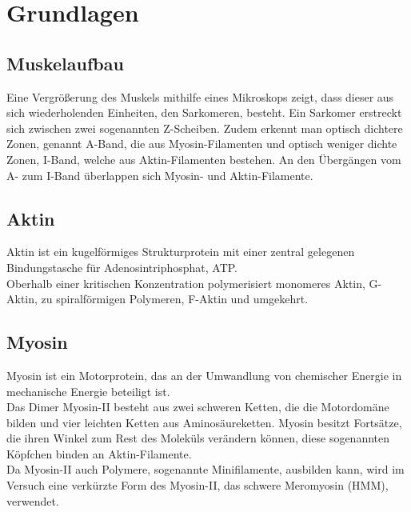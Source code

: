 
\section{Grundlagen}
\subsection{Muskelaufbau}
Eine Vergrößerung des Muskels mithilfe eines Mikroskops zeigt, dass dieser aus sich wiederholenden Einheiten, den Sarkomeren, besteht. Ein Sarkomer erstreckt sich zwischen zwei sogenannten Z-Scheiben. Zudem erkennt man optisch dichtere Zonen, genannt A-Band, die aus Myosin-Filamenten und optisch weniger dichte Zonen, I-Band, welche aus Aktin-Filamenten bestehen. An den Übergängen vom A- zum I-Band überlappen sich Myosin- und Aktin-Filamente.
\subsection{Aktin}
Aktin ist ein kugelförmiges Strukturprotein mit einer zentral gelegenen Bindungstasche für Adenosintriphosphat, ATP.\\
Oberhalb einer kritischen Konzentration polymerisiert monomeres Aktin, G-Aktin, zu spiralförmigen Polymeren, F-Aktin und umgekehrt.
\subsection{Myosin}
Myosin ist ein Motorprotein, das an der Umwandlung von chemischer Energie in mechanische Energie beteiligt ist.\\
Das Dimer Myosin-II besteht aus zwei schweren Ketten, die die Motordomäne bilden und vier leichten Ketten aus Aminosäureketten. Myosin besitzt Fortsätze, die ihren Winkel zum Rest des Moleküls verändern können, diese sogenannten Köpfchen binden an Aktin-Filamente.\\
Da Myosin-II auch Polymere, sogenannte Minifilamente, ausbilden kann, wird im Versuch eine verkürzte Form des Myosin-II, das schwere Meromyosin (HMM), verwendet.
